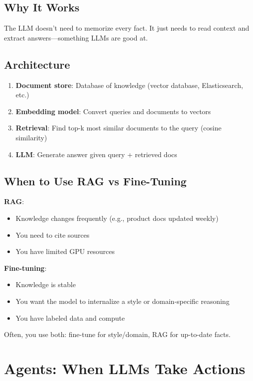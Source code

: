\documentclass[11pt,oneside]{book}
\begin{document}
\subsection{Why It Works}

The LLM doesn't need to memorize every fact. It just needs to read context and extract answers---something LLMs are good at.

\subsection{Architecture}

\begin{enumerate}
\item \textbf{Document store}: Database of knowledge (vector database, Elasticsearch, etc.)
\item \textbf{Embedding model}: Convert queries and documents to vectors
\item \textbf{Retrieval}: Find top-k most similar documents to the query (cosine similarity)
\item \textbf{LLM}: Generate answer given query + retrieved docs
\end{enumerate}

\subsection{When to Use RAG vs Fine-Tuning}

\textbf{RAG}:
\begin{itemize}
\item Knowledge changes frequently (e.g., product docs updated weekly)
\item You need to cite sources
\item You have limited GPU resources
\end{itemize}

\textbf{Fine-tuning}:
\begin{itemize}
\item Knowledge is stable
\item You want the model to internalize a style or domain-specific reasoning
\item You have labeled data and compute
\end{itemize}

Often, you use both: fine-tune for style/domain, RAG for up-to-date facts.

\section{Agents: When LLMs Take Actions}
\end{document}
